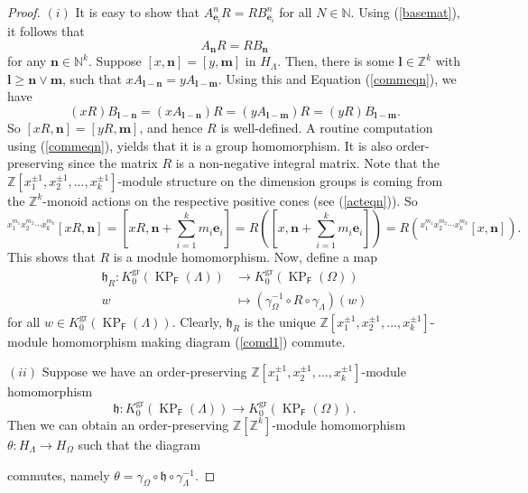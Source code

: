 \documentclass[12pt]{amsart}
\newcommand{\N}{\mathbf{n}}
\newcommand{\M}{\mathbf{m}}
\newcommand{\KP}{\operatorname{KP}}
\theoremstyle{definition}
\theoremstyle{remark}
\newcommand{\gr}{\operatorname{gr}}
\begin{document}
\begin{proof}
$(i)$ It is easy to show that $A_{\mathbf{e}_i}^n R=RB_{\mathbf{e}_i}^n$ for all $N\in \mathbb{N}$. Using (\ref{basemat}), it follows that
\begin{equation}\label{commeqn}
A_\N R=RB_\N
\end{equation}
for any $\N\in \mathbb{N}^k$. Suppose $[x,\N]=[y,\M]$ in $H_\Lambda$. Then, there is some $\mathbf{l}\in \mathbb{Z}^k$ with $\mathbf{l}\ge \N\vee \M$, such that $xA_{\mathbf{l}-\N}=yA_{\mathbf{l}-\M}$. Using this and Equation (\ref{commeqn}), we have \[(xR)B_{\mathbf{l}-\N}=(xA_{\mathbf{l}-\N})R=(yA_{\mathbf{l}-\M})R=(yR)B_{\mathbf{l}-\M}.\]
So $[xR,\N]=[yR,\M]$, and hence $R$ is well-defined. A routine computation using (\ref{commeqn}), yields that it is a group homomorphism. It is also order-preserving since the matrix $R$ is a non-negative integral matrix. Note that the $\mathbb{Z}[x_1^{\pm 1},x_2^{\pm 1},\ldots,x_k^{\pm 1}]$-module structure on the dimension groups is coming from the $\mathbb{Z}^k$-monoid actions on the respective positive cones (see (\ref{acteqn})). So
\[^{x_1^{m_1}x_2^{m_2}\cdots x_k^{m_k}}[xR,\N]=[xR,\N+\displaystyle{\sum_{i=1}^{k}} m_i\mathbf{e}_i]=R([x,\N+\displaystyle{\sum_{i=1}^{k}} m_i\mathbf{e}_i])=R(^{x_1^{m_1}x_2^{m_2}\cdots x_k^{m_k}}[x,\N]).\]
This shows that $R$ is a module homomorphism. Now, define a map
\begin{align*}
    \mathfrak{h}_R:K_0^{\gr}(\KP_{\mathsf{F}}(\Lambda)) &\longrightarrow K_0^{\gr}(\KP_{\mathsf{F}}(\Omega))\\
    w & \longmapsto (\gamma_\Omega^{-1}\circ R \circ \gamma_\Lambda)(w)
\end{align*}
for all $w\in K_0^{\gr}(\KP_{\mathsf{F}}(\Lambda))$. Clearly, $\mathfrak{h}_R$ is the unique $\mathbb{Z}[x_1^{\pm 1},x_2^{\pm 1},\ldots,x_k^{\pm 1}]$-module homomorphism making diagram (\ref{comd1}) commute.

$(ii)$ Suppose we have an order-preserving $\mathbb{Z}[x_1^{\pm 1},x_2^{\pm 1},\ldots,x_k^{\pm 1}]$-module homomorphism \[\mathfrak{h}:K_0^{\gr}(\KP_{\mathsf{F}}(\Lambda))\longrightarrow K_0^{\gr}(\KP_{\mathsf{F}}(\Omega)).\] Then we can obtain an order-preserving $\mathbb{Z}[\mathbb{Z}^k]$-module homomorphism $\theta: H_\Lambda\longrightarrow H_\Omega$ such that the diagram
\begin{center}
\end{center}
commutes, namely $\theta=\gamma_\Omega \circ \mathfrak{h} \circ \gamma_\Lambda^{-1}$.


\end{proof}
\end{document}
